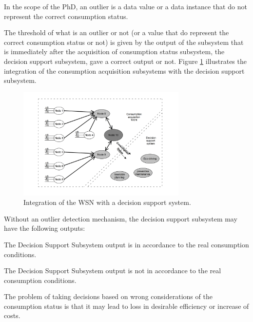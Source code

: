\vspace{1em}

In the scope of the PhD, an outlier is a data value or a data instance that do not represent the correct consumption status.

The threshold of what is an outlier or not (or a value that do represent the correct consumption status or not) is given by the output of the subsystem that is immediately after the acquisition of consumption status subsystem, the decision support subsystem, gave a correct output or not. Figure \ref{fig:general} illustrates the integration of the consumption acquisition subsystems with the decision support subsystem.


\begin{figure}[h!]
	\centering
	\includegraphics[width=0.75\textwidth,keepaspectratio]{figures/general}
	\caption{Integration of the WSN with a decision support system. }
	\label{fig:general}
\end{figure}

\newpage
Without an outlier detection mechanism, the decision support subsystem may have the following outputs:


\begin{description}
	\setlength\itemsep{-0.5em}
	\item[Input deviation from real value lower than a threshold]
	The Decision Support Subsystem output is in accordance to the real consumption conditions.
	\item[Input deviation from real value greater than a threshold]
	The Decision Support Subsystem output is not in accordance to the real consumption conditions.	
\end{description}

The problem of taking decisions based on wrong considerations of the consumption status is that it may lead to loss in desirable efficiency or increase of costs.

